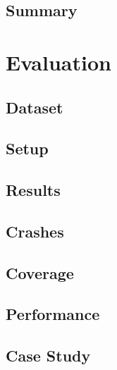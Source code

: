 \documentclass[runningheads]{llncs}
\begin{document}
\subsection{Summary}
\section{Evaluation}
\subsection{Dataset} %
\subsection{Setup} %
\subsection{Results} %
\subsection{Crashes}
\subsection{Coverage}
\subsection{Performance}
\subsection{Case Study} %
\end{document}
